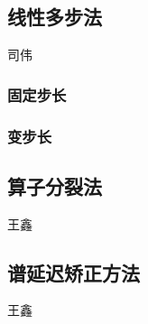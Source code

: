 \subsection{线性多步法}
{\color{red}\begin{center}
     司伟
\end{center}}
\subsubsection{固定步长}
\subsubsection{变步长}



\subsection{算子分裂法}
{\color{red}\begin{center}
    王鑫
\end{center}}


\subsection{谱延迟矫正方法}
{\color{red}\begin{center}
    王鑫
\end{center}}



